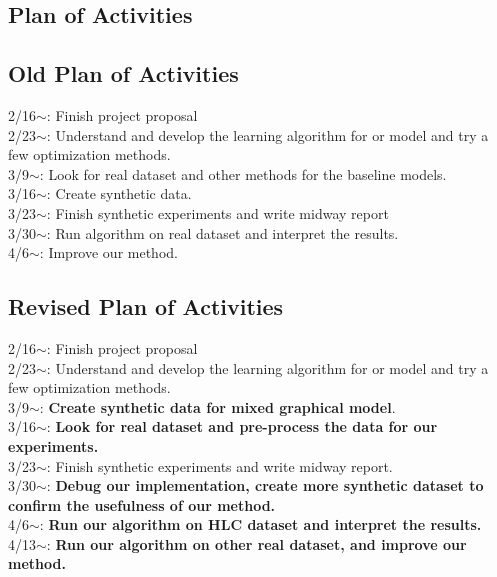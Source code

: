 \documentclass{article}
\begin{document}
\begin{appendices}
\section{Plan of Activities}
\subsection{Old Plan of Activities}

2/16$\sim$: Finish project proposal \\
2/23$\sim$: Understand and develop the learning algorithm for or model and try a few optimization methods. \\
3/9$\sim$: Look for real dataset and other methods for the baseline models.\\
3/16$\sim$:  Create synthetic data. \\ 
3/23$\sim$: Finish synthetic experiments and write midway report \\
3/30$\sim$: Run algorithm on real dataset and interpret the results. \\
4/6$\sim$: Improve our method. \\

\subsection{Revised Plan of Activities}

2/16$\sim$: Finish project proposal \\
2/23$\sim$: Understand and develop the learning algorithm for or model and try a few optimization methods. \\
3/9$\sim$:  \textbf{Create synthetic data for mixed graphical model}. \\ 
3/16$\sim$: \textbf{Look for real dataset and pre-process the data for our experiments.}\\
3/23$\sim$: Finish synthetic experiments and write midway report. \\
3/30$\sim$: \textbf{Debug our implementation, create more synthetic dataset to confirm the usefulness of our method.} \\
4/6$\sim$: \textbf{Run our algorithm on HLC dataset and interpret the results.} \\
4/13$\sim$: \textbf{Run our algorithm on other real dataset, and improve our method.} \\

\end{appendices}

\nocite{*}


\end{document}
